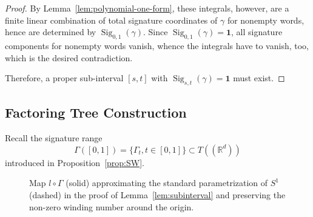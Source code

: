 \documentclass[11pt]{article}
\theoremstyle{definition}
\newcommand{\R}{\mathbb{R}}
\newcommand{\Sig}{\operatorname{Sig}}
\newcommand{\id}{\mathbf{1}}
\begin{document}
\begin{proof}
By Lemma~\ref{lem:polynomial-one-form}, these integrals, however, are a finite linear combination of total signature coordinates of $\gamma$ for nonempty words, hence are determined by $\Sig_{0,1}(\gamma)$. Since $ \Sig_{0,1}(\gamma)=\id $, all signature components for nonempty words vanish, whence the integrals have to vanish, too, which is the desired contradiction.

Therefore, a proper sub-interval $ [s,t] $ with $ \Sig_{s,t}(\gamma)=\id $ must exist.
\end{proof}

\subsection*{Factoring Tree Construction}


Recall the signature range  
$$\Gamma([0,1]) = \{\Gamma_t, t\in [0,1]\} \subset T((\R^d))$$ introduced in Proposition~\ref{prop:SW}. 

\begin{figure}[t]
    \centering
    \caption{Map $l \circ \Gamma$ (solid) approximating the standard parametrization
    of $S^1$ (dashed) in the proof of Lemma~\ref{lem:subinterval} and preserving
    the non-zero winding number around the origin.}
    \label{fig:winding_approximation}
\end{figure}
\end{document}
